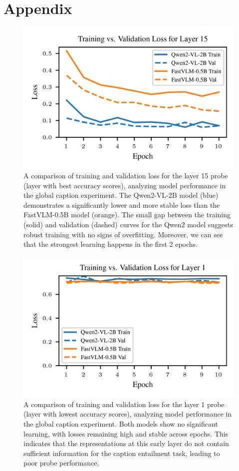 \documentclass[11pt]{article}
\begin{document}
\section{Appendix}
\begin{figure}[H]
    \centering
    \includegraphics[width=1\linewidth]{figures/global/_combined_exp1/combined_training_progress_layer_15.png}
    \caption{A comparison of training and validation loss for the layer 15 probe (layer with best accuracy scores), analyzing model performance in the global caption experiment. The Qwen2-VL-2B model (blue) demonstrates a significantly lower and more stable loss than the FastVLM-0.5B model (orange). The small gap between the training (solid) and validation (dashed) curves for the Qwen2 model suggests robust training with no signs of overfitting. Moreover, we can see that the strongest learning happens in the first 2 epochs.}
\end{figure}

\begin{figure}[H]
    \centering
    \includegraphics[width=1\linewidth]{figures/global/_combined_exp1/combined_training_progress_layer_1.png}
    \caption{A comparison of training and validation loss for the layer 1 probe (layer with lowest accuracy scores), analyzing model performance in the global caption experiment. Both models show no significant learning, with losses remaining high and stable across epochs. This indicates that the representations at this early layer do not contain sufficient information for the caption entailment task, leading to poor probe performance.}
\end{figure}
\end{document}
